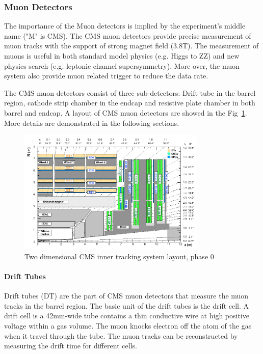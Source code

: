 \subsubsection{Muon Detectors}

The importance of the Muon detectors is implied by the experiment’s middle name ("M" is CMS). The CMS muon detectors provide precise measurement of muon tracks with the support of strong magnet field (3.8T). The measurement of muons is useful in both standard model physics (e.g. Higgs to ZZ) and new physics search (e.g. leptonic channel supersymmetry). More over, the muon system also provide muon related trigger to reduce the data rate.

The CMS muon detectors consist of three sub-detectors: Drift tube in the barrel region, cathode strip chamber in the endcap and resistive plate chamber in both barrel and endcap. A layout of CMS muon detectors are showed in the Fig~\ref{fig:c3cms2dmuondets}. More details are demonstrated in the following sections. 

\begin{figure}[htbp]
 \begin{center}
  \includegraphics[width=0.8\textwidth]{figures/c3/c3_cms_2dmuondets.png}
 \end{center}
 \caption{Two dimensional CMS inner tracking system layout, phase 0}
 \label{fig:c3cms2dmuondets}
\end{figure}

\paragraph{Drift Tubes}
Drift tubes (DT) are the part of CMS muon detectors that measure the muon tracks in the barrel region. The basic unit of the drift tubes is the drift cell. A drift cell is a 42mm-wide tube contains a thin conductive wire at high positive voltage within a gas volume. The muon knocks electron off the atom of the gas when it travel through the tube. The muon tracks can be reconstructed by measuring the drift time for different cells. 

